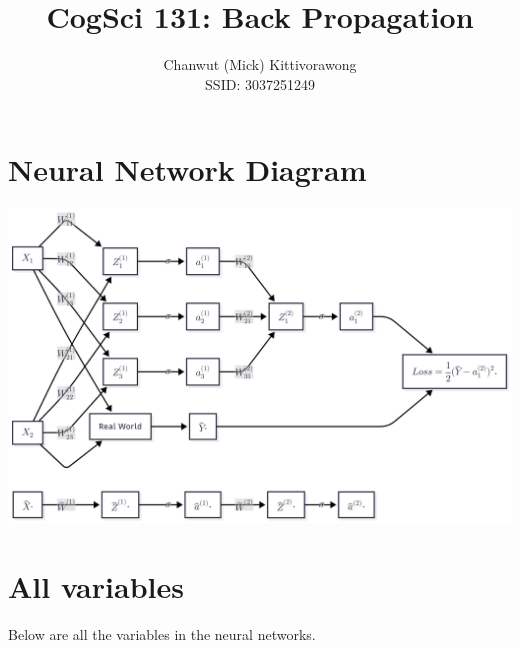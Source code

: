 \documentclass[sigconf, nonacm]{acmart}
\begin{document}
\title{CogSci 131: Back Propagation}

\author{Chanwut (Mick) Kittivorawong\\SSID: 3037251249}

\maketitle

\section{Neural Network Diagram}
\includegraphics[width=\textwidth]{nn.png}

\section{All variables}
Below are all the variables in the neural networks.\\
\end{document}
